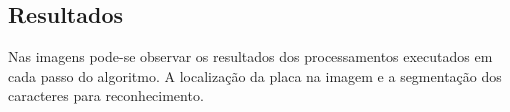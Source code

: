 \documentclass[a0,portrait]{a0poster}
\begin{document}
\begin{multicols}{2}
\color{NavyBlue}
\section*{\huge Resultados}
\color{Black}

Nas imagens pode-se observar os resultados dos processamentos executados em cada 
passo do algoritmo. A localização da placa na imagem e a segmentação
dos caracteres para reconhecimento.


% 
% 

\end{multicols}

\end{document}
